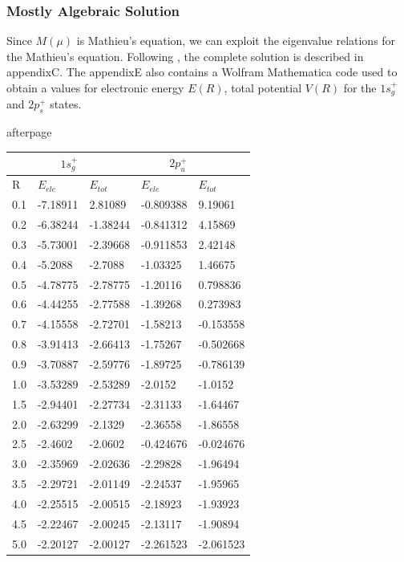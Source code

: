 \subsubsection{Mostly Algebraic Solution}

Since $ M(\mu) $ is Mathieu's equation, we can exploit the eigenvalue relations for the Mathieu's equation. Following \cite{H2Plus2d2}, the complete solution is described in appendixC. The appendixE also contains a Wolfram Mathematica code used to obtain a values for electronic energy $ E(R) $, total potential $ V(R) $ for the  $ 1s_g^{+} $ and $2p_{s}^{+} $ states. 

afterpage{
  \label{tab:H2Plus2D}
  \begin{tabular}{ |l|l|l|l|l| }
      \hline
      \multicolumn{1}{r}{} &
      \multicolumn{1}{r}{ $ 1s_g^+ $} &
      \multicolumn{1}{r}{} &
      \multicolumn{1}{r}{$ 2p_u^+ $ } \\
      \hline
      R & $ E_{ele} $ & $ E_{tot} $ & $ E_{ele} $ & $ E_{tot} $  \\ 
      0.1 & -7.18911 & 2.81089 & -0.809388 & 9.19061 \\
      0.2 & -6.38244 & -1.38244 & -0.841312 & 4.15869\\
      0.3 & -5.73001 & -2.39668 & -0.911853 & 2.42148 \\
      0.4 & -5.2088 & -2.7088 & -1.03325 &  1.46675\\
      0.5 & -4.78775 & -2.78775 & -1.20116 & 0.798836 \\
      0.6 & -4.44255 & -2.77588 & -1.39268 & 0.273983\\
      0.7 & -4.15558 & -2.72701 & -1.58213 & -0.153558 \\
      0.8 & -3.91413 & -2.66413 & -1.75267 & -0.502668 \\
      0.9 & -3.70887 & -2.59776 & -1.89725 & -0.786139\\
      1.0 & -3.53289 & -2.53289 & -2.0152 & -1.0152 \\
      1.5 & -2.94401 & -2.27734 & -2.31133 & -1.64467\\
      2.0 & -2.63299 & -2.1329 & -2.36558 & -1.86558 \\
      2.5 & -2.4602 & -2.0602 & -0.424676 & -0.024676\\
      3.0 & -2.35969 & -2.02636 & -2.29828 & -1.96494 \\
      3.5 & -2.29721 & -2.01149 & -2.24537 & -1.95965 \\
      4.0 & -2.25515 & -2.00515 & -2.18923 & -1.93923 \\
      4.5 & -2.22467 & -2.00245 & -2.13117 & -1.90894 \\
      5.0 & -2.20127 & -2.00127 & -2.261523 & -2.061523 \\
      \hline 
  \end{tabular}
}

